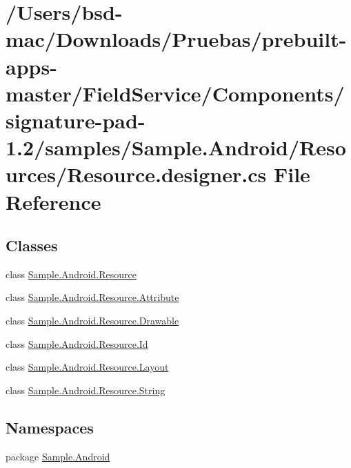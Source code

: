 \hypertarget{_components_2signature-pad-1_82_2samples_2_sample_8_android_2_resources_2_resource_8designer_8cs}{\section{/\+Users/bsd-\/mac/\+Downloads/\+Pruebas/prebuilt-\/apps-\/master/\+Field\+Service/\+Components/signature-\/pad-\/1.2/samples/\+Sample.Android/\+Resources/\+Resource.designer.\+cs File Reference}
\label{_components_2signature-pad-1_82_2samples_2_sample_8_android_2_resources_2_resource_8designer_8cs}
}
\subsection*{Classes}
\begin{DoxyCompactItemize}
\item 
class \hyperlink{class_sample_1_1_android_1_1_resource}{Sample.\+Android.\+Resource}
\item 
class \hyperlink{class_sample_1_1_android_1_1_resource_1_1_attribute}{Sample.\+Android.\+Resource.\+Attribute}
\item 
class \hyperlink{class_sample_1_1_android_1_1_resource_1_1_drawable}{Sample.\+Android.\+Resource.\+Drawable}
\item 
class \hyperlink{class_sample_1_1_android_1_1_resource_1_1_id}{Sample.\+Android.\+Resource.\+Id}
\item 
class \hyperlink{class_sample_1_1_android_1_1_resource_1_1_layout}{Sample.\+Android.\+Resource.\+Layout}
\item 
class \hyperlink{class_sample_1_1_android_1_1_resource_1_1_string}{Sample.\+Android.\+Resource.\+String}
\end{DoxyCompactItemize}
\subsection*{Namespaces}
\begin{DoxyCompactItemize}
\item 
package \hyperlink{namespace_sample_1_1_android}{Sample.\+Android}
\end{DoxyCompactItemize}
